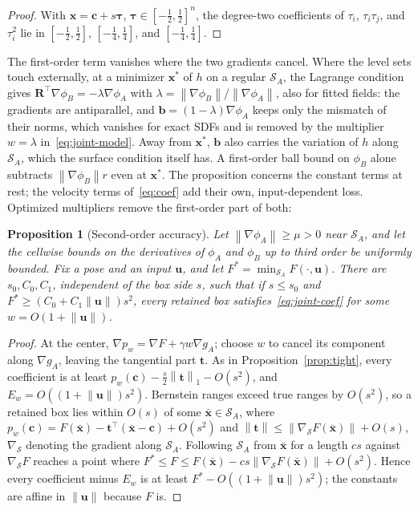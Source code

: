 \documentclass[journal]{IEEEtran}
\newtheorem{proposition}{Proposition}
\theoremstyle{definition}
\newcommand{\norm}[1]{\left\lVert #1\right\rVert}
\newcommand{\Rot}{\mathbf{R}}
\begin{document}
\begin{proof}
With $\mathbf x=\mathbf c+s\boldsymbol\tau$, $\boldsymbol\tau\in[-\frac12,\frac12]^n$, the degree-two
coefficients of $\tau_i$, $\tau_i\tau_j$, and $\tau_i^2$ lie in $[-\frac12,\frac12]$,
$[-\frac14,\frac14]$, and $[-\frac14,\frac14]$.
\end{proof}
The first-order term vanishes where the two gradients cancel. Where the level sets touch
externally, at a minimizer $\mathbf x^\ast$ of $h$ on a regular $\mathcal S_A$, the Lagrange condition
gives $\Rot^\top\nabla\phi_B=-\lambda\nabla\phi_A$ with $\lambda=\norm{\nabla\phi_B}/\norm{\nabla\phi_A}$,
also for fitted fields: the gradients are antiparallel, and $\mathbf b=(1-\lambda)\nabla\phi_A$ keeps
only the mismatch of their norms, which vanishes for exact SDFs and is removed by the multiplier
$w=\lambda$ in~\eqref{eq:joint-model}. Away from $\mathbf x^\ast$, $\mathbf b$ also carries the
variation of $h$ along $\mathcal S_A$, which the surface condition itself has. A first-order ball
bound on $\phi_B$ alone subtracts $\norm{\nabla\phi_B}r$ even at $\mathbf x^\ast$. The proposition
concerns the constant terms at rest; the velocity terms of~\eqref{eq:coef} add their own,
input-dependent loss. Optimized multipliers remove the first-order part of both:
\begin{proposition}[Second-order accuracy]\label{prop:second}
Let $\norm{\nabla\phi_A}\ge\mu>0$ near $\mathcal S_A$, and let the cellwise bounds on the derivatives
of $\phi_A$ and $\phi_B$ up to third order be uniformly bounded. Fix a pose and an input $\mathbf u$, and let
$F^\ast=\min_{\mathcal S_A}F(\cdot,\mathbf u)$. There are $s_0,C_0,C_1$, independent of the box side
$s$, such that if $s\le s_0$ and $F^\ast\ge(C_0+C_1\norm{\mathbf u})s^2$, every retained box
satisfies~\eqref{eq:joint-coef} for some $w=O(1+\norm{\mathbf u})$.
\end{proposition}
\begin{proof}
At the center, $\nabla p_w=\nabla F+\gamma w\nabla g_A$; choose $w$ to cancel its component along
$\nabla g_A$, leaving the tangential part $\mathbf t$. As in Proposition~\ref{prop:tight}, every
coefficient is at least $p_w(\mathbf c)-\frac s2\norm{\mathbf t}_1-O(s^2)$, and
$E_w=O((1+\norm{\mathbf u})s^2)$. Bernstein ranges exceed true ranges by $O(s^2)$, so a retained box
lies within $O(s)$ of some $\bar{\mathbf x}\in\mathcal S_A$, where
$p_w(\mathbf c)=F(\bar{\mathbf x})-\mathbf t^\top(\bar{\mathbf x}-\mathbf c)+O(s^2)$ and
$\norm{\mathbf t}\le\norm{\nabla_{\mathcal S}F(\bar{\mathbf x})}+O(s)$, $\nabla_{\mathcal S}$ denoting
the gradient along $\mathcal S_A$. Following $\mathcal S_A$ from $\bar{\mathbf x}$ for a length $cs$
against $\nabla_{\mathcal S}F$ reaches a point where
$F^\ast\le F\le F(\bar{\mathbf x})-cs\norm{\nabla_{\mathcal S}F(\bar{\mathbf x})}+O(s^2)$. Hence every
coefficient minus $E_w$ is at least $F^\ast-O((1+\norm{\mathbf u})s^2)$; the constants are affine in
$\norm{\mathbf u}$ because $F$ is.
\end{proof}
\end{document}
